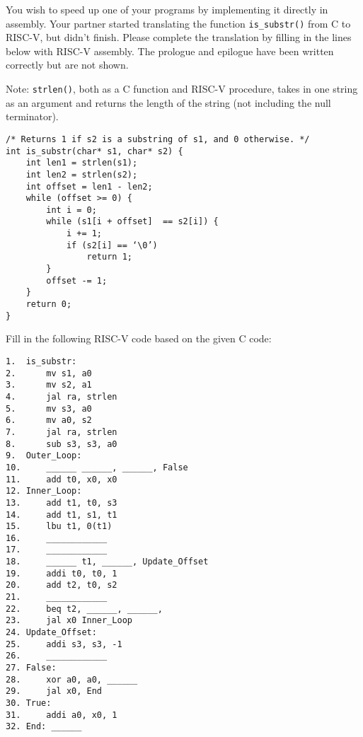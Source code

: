 \begin{blocksection}
\question
You wish to speed up one of your programs by implementing it directly in assembly. Your partner started translating the function \lstinline$is_substr()$ from C to RISC-V, but didn’t finish. Please complete the translation by filling in the lines below with RISC-V assembly. The prologue and epilogue have been written correctly but are not shown.

Note: \lstinline$strlen()$, both as a C function and RISC-V procedure, takes in one string as an argument and returns the length of the string (not including the null terminator).

\begin{verbatim}
/* Returns 1 if s2 is a substring of s1, and 0 otherwise. */
int is_substr(char* s1, char* s2) {
    int len1 = strlen(s1);
    int len2 = strlen(s2);
    int offset = len1 - len2;
    while (offset >= 0) {
        int i = 0;
        while (s1[i + offset]  == s2[i]) {
            i += 1;
            if (s2[i] == ‘\0’) 
                return 1;
        }
        offset -= 1;
    }
    return 0;
}
\end{verbatim}
\end{blocksection}

\begin{blocksection}
Fill in the following RISC-V code based on the given C code:

\begin{verbatim}
1.  is_substr:
2.      mv s1, a0
3.      mv s2, a1
4.      jal ra, strlen
5.      mv s3, a0
6.      mv a0, s2
7.      jal ra, strlen
8.      sub s3, s3, a0
9.  Outer_Loop:
10.     ______ ______, ______, False
11.     add t0, x0, x0
12. Inner_Loop:
13.     add t1, t0, s3
14.     add t1, s1, t1
15.     lbu t1, 0(t1)
16.     ____________
17.     ____________
18.     ______ t1, ______, Update_Offset
19.     addi t0, t0, 1
20.     add t2, t0, s2
21.     ____________
22.     beq t2, ______, ______,
23.     jal x0 Inner_Loop
24. Update_Offset: 
25.     addi s3, s3, -1
26.     ____________
27. False: 
28.     xor a0, a0, ______
29.     jal x0, End
30. True: 
31.     addi a0, x0, 1
32. End: ______
\end{verbatim}

\end{blocksection}

